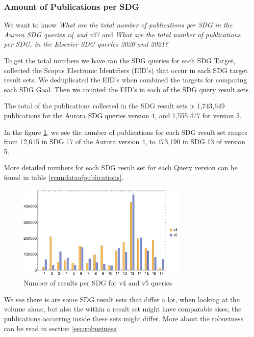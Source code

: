 \documentclass{article}
\begin{document}

\subsubsection{Amount of Publications per SDG}
We want to know \emph{What are the total number of publications per SDG in the Aurora SDG queries v4 and v5?} and \emph{What are the total number of  publications per SDG, in the Elsevier SDG queries 2020 and 2021?}

To get the total numbers we have ran the  SDG queries for each SDG Target, collected the Scopus Electronic Identifiers (EID's) that occur in each SDG target result sets. We deduplicated the EID's when combined the targets for comparing  each SDG Goal. Then we counted the EID's in each of the SDG query result sets.

The total of the publications collected in the SDG result sets is 1,743,649 publications for the Aurora SDG queries version 4, and 1,555,477 for version 5.

In the figure \ref{numberofresults}, we see the number of publications for each SDG result set ranges from 12,615 in SDG 17 of the Aurora version 4, to 473,190 in SDG 13 of version 5.

More detailed numbers for each SDG result set for each Query version can be found in table \ref{venndataofpublications}.

\begin{figure}[ht]
	\centering
  \includegraphics[width=0.75\textwidth]{figures/numberofresultsv4vsv5.pdf}
	\caption{Number of results per SDG for v4 and v5 queries}
	\label{numberofresults}
\end{figure}

We see there is are some SDG result sets that differ a lot, when looking at the volume alone, but also the within a result set might have comparable sises, the publications occurring inside these sets might differ. More about the robustness can be read in section \ref{sec:robustness}.
\end{document}
